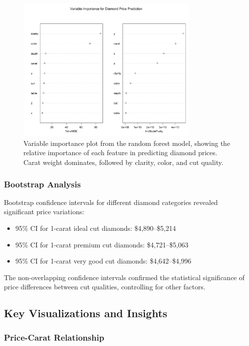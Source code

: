 \documentclass[11pt,a4paper]{article}
\begin{document}
\begin{figure}[H]
    \centering
    \includegraphics[width=0.8\textwidth]{variable_importance.png}
    \caption{Variable importance plot from the random forest model, showing the relative importance of each feature in predicting diamond prices. Carat weight dominates, followed by clarity, color, and cut quality.}
    \label{fig:variable_importance}
\end{figure}

\subsubsection{Bootstrap Analysis}

Bootstrap confidence intervals for different diamond categories revealed significant price variations:

\begin{itemize}
    \item 95\% CI for 1-carat ideal cut diamonds: \$4,890--\$5,214
    \item 95\% CI for 1-carat premium cut diamonds: \$4,721--\$5,063
    \item 95\% CI for 1-carat very good cut diamonds: \$4,642--\$4,996
\end{itemize}

The non-overlapping confidence intervals confirmed the statistical significance of price differences between cut qualities, controlling for other factors.

\subsection{Key Visualizations and Insights}

\subsubsection{Price-Carat Relationship}
\end{document}

